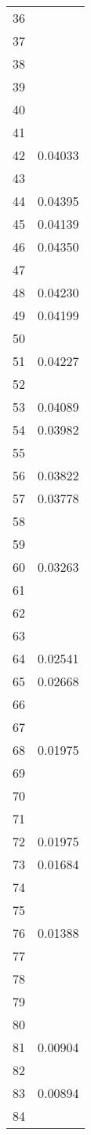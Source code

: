 \documentclass{elsarticle}
\begin{document}
\begin{center}
\begin{longtable}{|c|c|}
  36 &  \\
  37 &  \\
  38 &  \\
  39 &  \\
  40 &  \\
  41 &  \\
  42 & 0.04033 \\
  43 &  \\
  44 & 0.04395 \\
  45 & 0.04139 \\
  46 & 0.04350 \\
  47 &  \\
  48 & 0.04230 \\
  49 & 0.04199 \\
  50 &  \\
  51 & 0.04227 \\
  52 &  \\
  53 & 0.04089 \\
  54 & 0.03982 \\
  55 &  \\
  56 & 0.03822 \\
  57 & 0.03778 \\
  58 &  \\
  59 &  \\
  60 & 0.03263 \\
  61 &  \\
  62 &  \\
  63 &  \\
  64 & 0.02541 \\
  65 & 0.02668 \\
  66 &  \\
  67 &  \\
  68 & 0.01975 \\
  69 &  \\
  70 &  \\
  71 &  \\
  72 & 0.01975 \\
  73 & 0.01684 \\
  74 &  \\
  75 &  \\
  76 & 0.01388 \\
  77 &  \\
  78 &  \\
  79 &  \\
  80 &  \\
  81 & 0.00904 \\
  82 &  \\
  83 & 0.00894 \\
  84 &  \\

\end{longtable}
\end{center}
\end{document}
